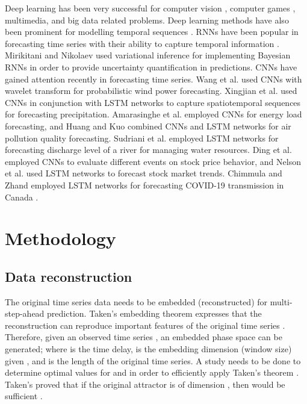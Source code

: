 \documentclass{ieeeaccess}
\begin{document}
Deep learning has  been very successful for computer vision \cite{he2016deep},  computer games \cite{mnih2013playing}, multimedia, and big data related problems. Deep learning  methods have also been prominent for modelling temporal sequences \cite{lecun2015deep,schmidhuber2015deep}. RNNs   have been popular in forecasting time series with their ability to capture temporal information \cite{connor1994recurrent,husken2003recurrent, chandra2012cooperative,chandra2015competition,SALINAS2020}.    Mirikitani and Nikolaev   used \cite{mirikitani2010recursive}  variational  inference  for implementing Bayesian RNNs in order to provide  uncertainty quantification in predictions. CNNs have gained attention recently in  forecasting time series. Wang et al.  \cite{wang2017deep}  used CNNs with  wavelet transform for  probabilistic wind power forecasting. Xingjian et al.   \cite{xingjian2015convolutional} used   CNNs  in conjunction with LSTM networks to capture spatiotemporal sequences   for forecasting precipitation. Amarasinghe et al. \cite{Amarasinghe2017Deepelf} employed  CNNs for   energy load forecasting, and  Huang and Kuo \cite{Huang2018CNN-LSTM} combined CNNs and LSTM networks for air pollution quality forecasting. 
Sudriani et al. \cite{sudriani2019long} employed  LSTM networks for forecasting discharge level of a river for  managing water resources. Ding et al. \cite{Ding2015} employed  CNNs to evaluate   different events on stock price behavior,  and  Nelson et al. \cite{nelson2017stock} used LSTM networks to forecast stock market trends. Chimmula and Zhand  employed LSTM networks for forecasting COVID-19 transmission in Canada  \cite{CHIMMULA2020}.  

 
 
\section{Methodology} 

\subsection{Data reconstruction }
   
The original time series data needs to be embedded (reconstructed) for    multi-step-ahead  
prediction. Taken's embedding theorem expresses that the
reconstruction can reproduce  important
features  of the original time series  \cite{Takens1981}. Therefore, given an 
observed time series , an embedded  phase
space  can be generated; where  is the time delay,  is
the embedding dimension (window size) given , and  is the length 
of the
original time series. A study needs to be done to determine optimal values for  and 
 in order to efficiently apply Taken's theorem 
\cite{frazier2004}.   Taken's proved that if the original attractor is of
dimension , then  would be sufficient \cite{Takens1981}.    
\end{document}
